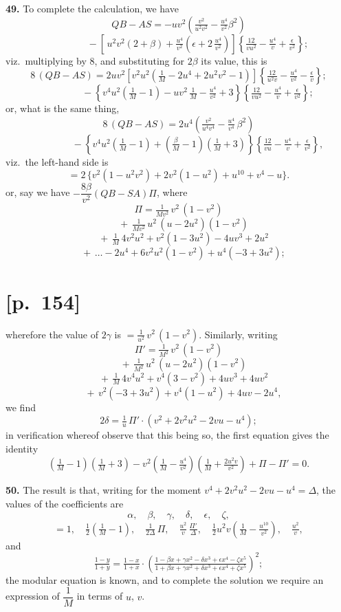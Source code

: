 \documentclass[11pt]{article}
\begin{document}
\medskip
\noindent\textbf{49.} To complete the calculation, we have
\[
QB-AS=-uv^2\!\left(\tfrac{v^2}{u^2v^2}-\tfrac{u^4}{v^2}\beta^2\right)\!
\]
\[
\hspace{4em}-\!\left[\,u^2v^2(2+\beta)+\tfrac{u^4}{v^2}\!\left(\epsilon+2\,\tfrac{u^4}{v^2}\right)\!\right]\!\left\{\tfrac{12}{vu^2}-\tfrac{u^4}{v}+\tfrac{\epsilon}{v^2}\right\}\!;
\]
viz.\ multiplying by 8, and substituting for $2\beta$ its value, this is
\[
8\,(QB-AS)=2uv^2\!\left[v^2u^2\!\left(\tfrac{1}{M}-2u^4+2u^2v^2-1\right)\!\right]\!\left\{\tfrac{12}{u^2v}-\tfrac{u^4}{v^2}-\tfrac{\epsilon}{v}\right\}\!;
\]
\[
\hspace{4em}-\!\left\{v^4u^2\!\left(\tfrac{1}{M}-1\right)\!-uv^2\,\tfrac{1}{M}-\tfrac{u^4}{v^2}+3\right\}\!\left\{\tfrac{12}{vu^2}-\tfrac{u^4}{v}+\tfrac{\epsilon}{v^2}\right\}\!;
\]
or, what is the same thing,
\[
8\,(QB-AS)=2u^4\!\left(\tfrac{v^2}{u^4v^4}-\tfrac{u^4}{v^4}\,\beta^2\right)\!
\]
\[
\hspace{4em}-\!\left\{v^4u^2\!\left(\tfrac{1}{M}-1\right)\!\!+\!\left(\tfrac{\beta}{M}-1\right)\!\!\left(\tfrac{1}{M}+3\right)\right\}\!\left\{\tfrac{12}{vu}-\tfrac{u^4}{v}+\tfrac{\epsilon}{v^2}\right\}\!,
\]
viz.\ the left-hand side is
\[
=2\,\{v^2(1-u^2v^2)+2v^2(1-u^2)+u^{10}+v^4-u\}.
\]
or, say we have $-\dfrac{8\beta}{v^2}(QB-SA)\Pi$, where
\[
\Pi=\tfrac{1}{Mv^2}\,v^2\,(1-v^2)
\]
\[
\quad+\,\tfrac{1}{Mv^2}\,u^2\,(u-2u^2)(1-v^2)
\]
\[
\quad+\,\tfrac{1}{M}\,4v^2u^2+v^2(1-3u^2)-4uv^3+2u^2
\]
\[
\quad+\,\ldots-2u^4+6v^2u^2(1-v^2)+u^4(-3+3u^2);
\]

\section*{[p.~154]}
wherefore the value of $2\gamma$ is $=\tfrac{1}{u^2}\,v^2\,(1-v^2)$. Similarly, writing
\[
\Pi'=\tfrac{1}{M^2}\,v^2\,(1-v^2)
\]
\[
\quad+\,\tfrac{1}{M^2}\,u^2\,(u-2u^2)(1-v^2)
\]
\[
\quad+\,\tfrac{1}{M}\,4v^4u^2+v^4(3-v^2)+4uv^3+4uv^2
\]
\[
\quad+\,v^2(-3+3u^2)+v^4(1-u^2)+4uv-2u^4,
\]
we find
\[
2\delta=\tfrac{1}{u}\,\Pi'\cdot (v^2+2v^2u^2-2vu-u^4);
\]
in verification whereof observe that this being so, the first equation gives the identity
\[
\!\left(\tfrac{1}{M}-1\right)\!\!\left(\tfrac{1}{M}+3\right)\!-v^2\!\left(\tfrac{1}{M}-\tfrac{u^4}{v^2}\right)\!\!\left(\tfrac{1}{M}+\tfrac{2u^2v}{v^2}\right)\!\!+\Pi-\Pi'=0.
\]

\medskip
\noindent\textbf{50.} The result is that, writing for the moment $v^4+2v^2u^2-2vu-u^4=\Delta$, the values
of the coefficients are
\[
\alpha,\quad \beta,\quad \gamma,\quad \delta,\quad \epsilon,\quad \zeta,
\]
\[
=1,\quad \tfrac{1}{2}\!\left(\tfrac{1}{M}-1\right)\!,\quad \tfrac{1}{2\Delta}\,\Pi,\quad \tfrac{u^2}{v}\,\tfrac{\Pi'}{\Delta},\quad \tfrac{1}{2}u^2v\!\left(\tfrac{1}{M}-\tfrac{u^{10}}{v^2}\right)\!,\quad \tfrac{u^2}{v},
\]
and
\[
\tfrac{1-y}{1+y}=\tfrac{1-x}{1+x}\!\cdot\!\left(\tfrac{1-\beta x+\gamma x^2-\delta x^3+\epsilon x^4-\zeta x^5}{1+\beta x+\gamma x^2+\delta x^3+\epsilon x^4+\zeta x^5}\right)^{\!2}\!;
\]
the modular equation is known, and to complete the solution we require an expression of $\dfrac{1}{M}$ in terms of $u$, $v$.
\end{document}
